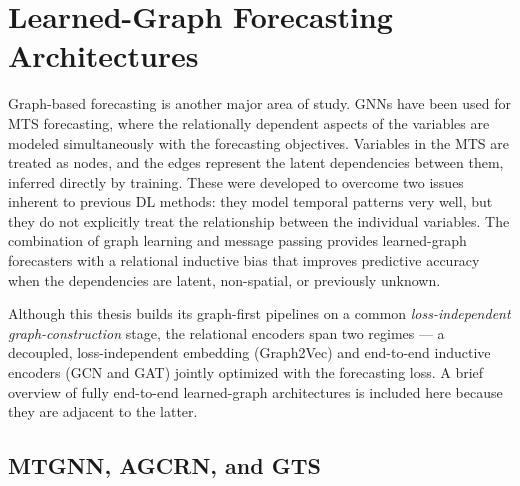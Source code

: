 \section{Learned-Graph Forecasting Architectures}
\label{sec:learned-graph-pathb}

Graph-based forecasting is another major area of study. \acp{GNN} have been used for \ac{MTS} forecasting, where the relationally dependent aspects of the variables are modeled simultaneously with the forecasting objectives. Variables in the \ac{MTS} are treated as nodes, and the edges represent the latent dependencies between them, inferred directly by training. These were developed to overcome two issues inherent to previous DL methods: they model temporal patterns very well, but they do not explicitly treat the relationship between the individual variables. The combination of graph learning and message passing provides learned-graph forecasters with a relational inductive bias that improves predictive accuracy when the dependencies are latent, non-spatial, or previously unknown.

Although this thesis builds its graph-first pipelines on a common
\emph{loss-independent graph-construction} stage, the relational encoders span two
regimes --- a decoupled, loss-independent embedding (Graph2Vec) and end-to-end
inductive encoders (\ac{GCN} and \ac{GAT}) jointly optimized with the forecasting loss. A
brief overview of fully end-to-end learned-graph architectures is included here
because they are adjacent to the latter.

\subsection{MTGNN, AGCRN, and GTS}
\label{sec:pathb-mtgnn-agcrn-gts}

